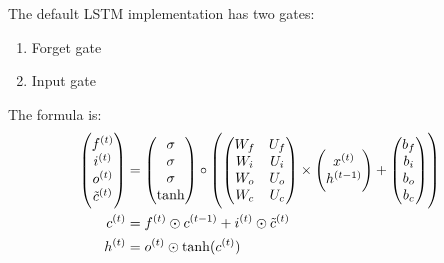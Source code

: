 \begin{definition}
The default LSTM implementation has two gates:
\begin{enumerate}
    \item Forget gate
    \item Input gate
\end{enumerate}

The formula is:
\begin{equation}
    \begin{aligned}
        \begin{pmatrix}
            {f}^{(t)} \\
            {i}^{(t)} \\
            {o}^{(t)} \\
            {\tilde{c}}^{(t)}
        \end{pmatrix} &= \begin{pmatrix}
            \sigma \\
            \sigma \\
            \sigma \\
            \tanh
        \end{pmatrix} \circ \left( \begin{pmatrix}
            W_f & U_f \\
            W_i & U_i \\
            W_o & U_o \\
            W_c & U_c
        \end{pmatrix} \times \begin{pmatrix}
            {x}^{(t)} \\
            {h}^{(t-1)}
        \end{pmatrix} + \begin{pmatrix}
            b_f \\
            b_i \\
            b_o \\
            b_c
        \end{pmatrix} \right) \\
        {c}^{(t)} &= {f}^{(t)} \odot {c}^{(t-1)} + {i}^{(t)} \odot {\tilde{c}}^{(t)} \\
        {h}^{(t)} &= {o}^{(t)} \odot \tanh({c}^{(t)})
    \end{aligned}
\end{equation}


\end{definition}
